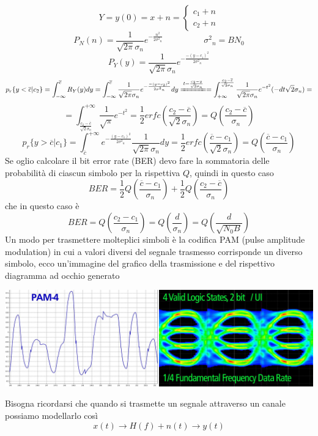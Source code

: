 \documentclass{article}
\begin{document}
\[Y=y(0)=x+n=\begin{cases}
    c_1+n\\
    c_2+n
\end{cases}\]
\[P_N(n)=\frac{1}{\sqrt{2\pi}\sigma_n}e^{-\frac{n^2}{2{\sigma^2}_n}}\hspace{2cm}{\sigma^2}_n=BN_0\]
\[P_Y(y)=\frac{1}{\sqrt{2\pi}\sigma_n}e^{-\frac{-{(y-c_i)}^2}{2{\sigma^2}_n}}\]
\[p_r\{y<\overline{c}|c_2\}=\int_{-\infty}^{\overline{c}}R_Y(y)dy=\int_{-\infty}^{\overline{c}}\frac{1}{\sqrt{2\pi}\sigma_n}e^{-\frac{-{(y-c_2)}^2}{2{\sigma^2}_n}}dy\xlongequal{t=\frac{c_2-y}{\sqrt{2}\sigma_n}}=\int_{+\infty}^{\frac{c_2-\overline{c}}{\sqrt{2}\sigma_n}}\frac{1}{\sqrt{2\pi}\sigma_n}e^{-t^2}(-dt\sqrt{2}\sigma_n)=\]
\[=\int_{\frac{c_2-\overline{c}}{\sqrt{2}\sigma_n}}^{+\infty}\frac{1}{\sqrt{\pi}}e^{-t^2}=\frac{1}{2}erfc\left(\frac{c_2-\overline{c}}{\sqrt{2}\sigma_n}\right)=Q\left(\frac{c_2-\overline{c}}{\sigma_n}\right)\]
\[p_r\{y>\overline{c}|c_1\}=\int_{\overline{c}}^{+\infty}e^{-\frac{{{(y-c_1)}^2}}{2{\sigma^2}_n}}\frac{1}{\sqrt{2\pi}\sigma_n}dy=\frac{1}{2}erfc\left(\frac{\overline{c}-c_1}{\sqrt{2}\sigma_n}\right)=Q\left(\frac{\overline{c}-c_1}{\sigma_n}\right)\]
Se oglio calcolare il bit error rate (BER) devo fare la sommatoria delle probabilità di ciascun simbolo per la rispettiva \(Q\), quindi in questo caso
\[BER=\frac{1}{2}Q\left(\frac{\overline{c}-c_1}{\sigma_n}\right)+\frac{1}{2}Q\left(\frac{c_2-\overline{c}}{\sigma_n}\right)\]
che in questo caso è
\[BER=Q\left(\frac{c_2-c_1}{\sigma_n}\right)=Q\left(\frac{d}{\sigma_n}\right)=Q\left(\frac{d}{\sqrt{N_0 B}}\right)\]
Un modo per trasmettere molteplici simboli è la codifica PAM (pulse amplitude modulation) in cui a valori diversi del segnale trasmesso corrisponde un diverso simbolo, ecco un'immagine del grafico della trasmissione e del rispettivo diagramma ad occhio generato
\begin{center}
    \includegraphics[width=\textwidth]{images/pam.jpg}
\end{center}
Bisogna ricordarsi che quando si trasmette un segnale attraverso un canale possiamo modellarlo così
\[x(t)\to\boxed{H(f)+n(t)}\to y(t)\]
\end{document}
